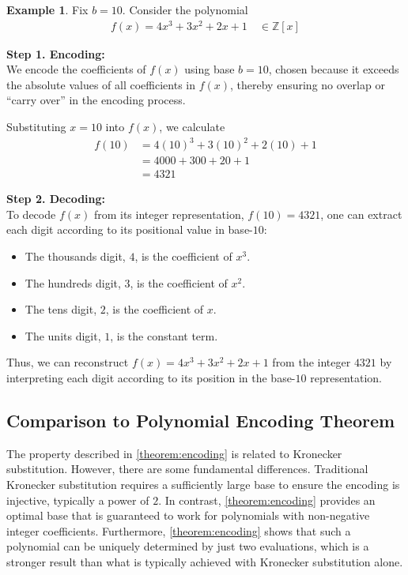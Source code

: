 \documentclass[11pt,reqno]{article}
\theoremstyle{plain}
\theoremstyle{definition}
\newtheorem{example}{Example}
\begin{document}
\begin{example}
Fix $b=10$. Consider the polynomial 
\begin{align*}
    f(x) = 4x^3 + 3x^2 + 2x + 1 \quad \in \mathbb{Z}[x]
\end{align*}

\textbf{Step 1. Encoding:} \\
We encode the coefficients of $f(x)$ using base $b=10$, chosen because it exceeds the absolute values of all coefficients in $f(x)$, thereby ensuring no overlap or ``carry over'' in the encoding process.

Substituting $x = 10$ into $f(x)$, we calculate
\begin{align*}
    f(10) &= 4(10)^3 + 3(10)^2 + 2(10) + 1 \\
    &= 4000 + 300 + 20 + 1 \\
    &= 4321
\end{align*}

\textbf{Step 2. Decoding:} \\
To decode $f(x)$ from its integer representation, $f(10) = 4321$, one can extract each digit according to its positional value in base-$10$:
\begin{itemize}
    \item The thousands digit, $4$, is the coefficient of $x^3$.
    \item The hundreds digit, $3$, is the coefficient of $x^2$.
    \item The tens digit, $2$, is the coefficient of $x$.
    \item The units digit, $1$, is the constant term.
\end{itemize}

Thus, we can reconstruct $f(x) = 4x^3 + 3x^2 + 2x + 1$ from the integer $4321$ by interpreting each digit according to its position in the base-$10$ representation.
\end{example}

\subsection{Comparison to Polynomial Encoding Theorem}
The property described in \cref{theorem:encoding} is related to Kronecker substitution. However, there are some fundamental differences. Traditional Kronecker substitution requires a sufficiently large base to ensure the encoding is injective, typically a power of $2$. In contrast, \cref{theorem:encoding} provides an optimal base that is guaranteed to work for polynomials with non-negative integer coefficients. Furthermore, \cref{theorem:encoding} shows that such a polynomial can be uniquely determined by just two evaluations, which is a stronger result than what is typically achieved with Kronecker substitution alone.
\end{document}
